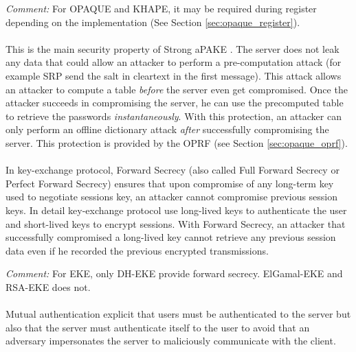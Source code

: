 ﻿\documentclass[../report.tex]{subfiles}
\begin{document}
\emph{Comment:} For OPAQUE and KHAPE, it may be required during register depending on the implementation (See Section \ref{sec:opaque_register}).


\paragraph{} \label{sec:secure_against_pca}
This is the main security property of Strong aPAKE \cite{OPAQUE_Paper}. The server does not leak any data that could allow an attacker to perform a pre-computation attack (for example SRP send the salt in cleartext in the first message). This attack allows an attacker to compute a table \emph{before} the server even get compromised. Once the attacker succeeds in compromising the server, he can use the precomputed table to retrieve the passwords \emph{instantaneously}. With this protection, an attacker can only perform an offline dictionary attack \emph{after} successfully compromising the server.
This protection is provided by the OPRF (see Section \ref{sec:opaque_oprf}).


\paragraph{}
In key-exchange protocol, Forward Secrecy (also called Full Forward Secrecy or Perfect Forward Secrecy) ensures that upon compromise of any long-term key used to negotiate sessions key, an attacker cannot compromise previous session keys.
In detail key-exchange protocol use long-lived keys to authenticate the user and short-lived keys to encrypt sessions. With Forward Secrecy, an attacker that successfully compromised a long-lived key cannot retrieve any previous session data even if he recorded the previous encrypted transmissions. %

\emph{Comment:} For EKE, only DH-EKE provide forward secrecy. ElGamal-EKE and RSA-EKE does not.


\paragraph{}
Mutual authentication explicit that users must be authenticated to the server but also that the server must authenticate itself to the user to avoid that an adversary impersonates the server to maliciously communicate with the client.
\end{document}
